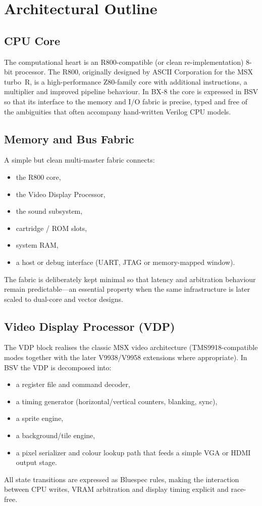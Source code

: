\documentclass[11pt,a4paper]{article}
\begin{document}
\section{Architectural Outline}

\subsection{CPU Core}

The computational heart is an R800-compatible (or clean re-implementation) 8-bit processor. The R800, originally designed by ASCII Corporation for the MSX turbo~R, is a high-performance Z80-family core with additional instructions, a multiplier and improved pipeline behaviour. In BX-8 the core is expressed in BSV so that its interface to the memory and I/O fabric is precise, typed and free of the ambiguities that often accompany hand-written Verilog CPU models.

\subsection{Memory and Bus Fabric}

A simple but clean multi-master fabric connects:
\begin{itemize}[leftmargin=1.5em]
  \item the R800 core,
  \item the Video Display Processor,
  \item the sound subsystem,
  \item cartridge / ROM slots,
  \item system RAM,
  \item a host or debug interface (UART, JTAG or memory-mapped window).
\end{itemize}
The fabric is deliberately kept minimal so that latency and arbitration behaviour remain predictable---an essential property when the same infrastructure is later scaled to dual-core and vector designs.

\subsection{Video Display Processor (VDP)}

The VDP block realises the classic MSX video architecture (TMS9918-compatible modes together with the later V9938/V9958 extensions where appropriate). In BSV the VDP is decomposed into:
\begin{itemize}[leftmargin=1.5em]
  \item a register file and command decoder,
  \item a timing generator (horizontal/vertical counters, blanking, sync),
  \item a sprite engine,
  \item a background/tile engine,
  \item a pixel serializer and colour lookup path that feeds a simple VGA or HDMI output stage.
\end{itemize}
All state transitions are expressed as Bluespec rules, making the interaction between CPU writes, VRAM arbitration and display timing explicit and race-free.
\end{document}
